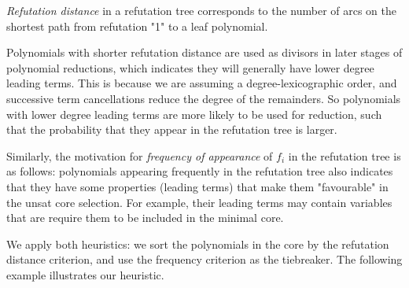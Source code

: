 \begin{definition}
\emph{Refutation distance} in a refutation tree corresponds to the number of arcs on
the shortest path from refutation "1" to a leaf
polynomial.
\end{definition}

Polynomials with shorter refutation distance are used as
divisors in later stages of polynomial reductions, which indicates
they will generally have lower degree leading terms.  
This is because we are assuming a degree-lexicographic order, and
successive term cancellations reduce the degree of the remainders. So
polynomials with lower degree leading terms are more  likely to be
used for reduction, such that the probability that they appear in
the refutation tree is larger.  

Similarly, the motivation for \emph{frequency of appearance} of $f_i$ in
the refutation tree is as follows: polynomials appearing frequently in
the refutation tree also indicates that they have some properties
(leading terms) that make them "favourable" in the unsat core
selection. For example, their leading terms may contain variables
that are require them to be included in the minimal core. 

We apply both heuristics: we sort the polynomials in the core
by the refutation distance criterion, and use the frequency criterion as
the tiebreaker. The following example illustrates our heuristic. 


